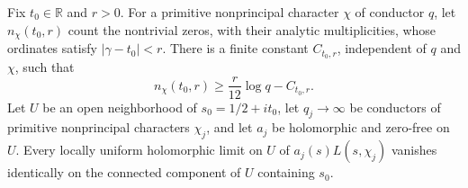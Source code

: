 \begin{proposition}\label{prop:conductor-local-count}
Fix $t_0\in\mathbb R$ and $r>0$. For a primitive nonprincipal
character $\chi$ of conductor $q$, let $n_\chi(t_0,r)$ count the
nontrivial zeros, with their analytic multiplicities, whose
ordinates satisfy $|\gamma-t_0|<r$. There is a finite constant
$C_{t_0,r}$, independent of $q$ and $\chi$, such that
\[
 n_\chi(t_0,r)\ge \frac r{12}\log q-C_{t_0,r}.
\]
Let $U$ be an open neighborhood of $s_0=1/2+it_0$, let
$q_j\to\infty$ be conductors of primitive nonprincipal
characters $\chi_j$, and let $a_j$ be holomorphic and zero-free
on $U$. Every locally uniform holomorphic limit on $U$ of
$a_j(s)L(s,\chi_j)$ vanishes identically on the connected
component of $U$ containing $s_0$.
\end{proposition}

